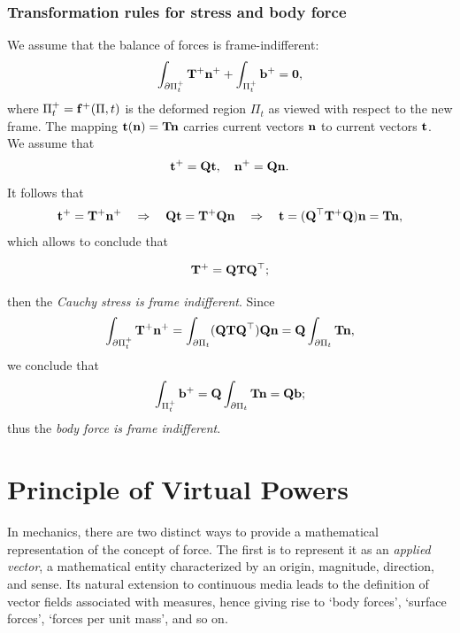 \subsection{Transformation rules for stress and body force}
We assume that the balance of forces is frame-indifferent:
\begin{equation}
	\int_{\partial\Pi_t^+}\mathbf{T}^+\mathbf{n}^++\int_{\Pi_t^+}\mathbf{b}^+=\mathbf{0},
\end{equation}
where $\Pi_t^+=\mathbf{f}^+(\Pi,t)$ is the deformed region $\Pi_t$ as viewed with respect to the new frame. The mapping $\mathbf{t}(\mathbf{n})=\mathbf{T}\mathbf{n}$ carries current vectors $\mathbf{n}$ to current vectors $\mathbf{t}$. We assume that
\begin{equation}
	\mathbf{t}^+=\mathbf{Q}\mathbf{t}, \quad \mathbf{n}^+=\mathbf{Q}\mathbf{n}.
\end{equation}
It follows that
\begin{equation}
	\mathbf{t}^+=\mathbf{T}^+\mathbf{n}^+ \quad \Rightarrow\quad \mathbf{Q}\mathbf{t}=\mathbf{T}^+\mathbf{Q}\mathbf{n}  \quad \Rightarrow\quad \mathbf{t}=(\mathbf{Q}^\top\mathbf{T}^+\mathbf{Q})\mathbf{n}=\mathbf{T}\mathbf{n},
\end{equation}
which allows to conclude that
\begin{definition}
	\begin{equation}
	\mathbf{T}^+=\mathbf{Q}\mathbf{T}\mathbf{Q}^\top;
\end{equation}
\end{definition}
then the \textit{Cauchy stress is frame indifferent}.
Since
\begin{equation}
	\int_{\partial\Pi_t^+}\mathbf{T}^+\mathbf{n}^+=\int_{\partial\Pi_t}(\mathbf{Q}\mathbf{T}\mathbf{Q}^\top)\mathbf{Q}\mathbf{n}=\mathbf{Q}\int_{\partial\Pi_t}\mathbf{T}\mathbf{n},
\end{equation}
we conclude that
\begin{equation}
	\int_{\Pi_t^+}\mathbf{b}^+=\mathbf{Q}\int_{\partial\Pi_t}\mathbf{T}\mathbf{n}=\mathbf{Q}\mathbf{b};
\end{equation}
thus the \textit{body force is frame indifferent}.









\chapter{Principle of Virtual Powers}\label{PPV}

In mechanics, there are two distinct ways to provide a mathematical representation of the concept of force. The first is to represent it as an \textit{applied vector}, a mathematical entity characterized by an origin, magnitude, direction, and sense. Its natural extension to continuous media leads to the definition of vector fields associated with measures, hence giving rise to `body forces', `surface forces', `forces per unit mass', and so on.

